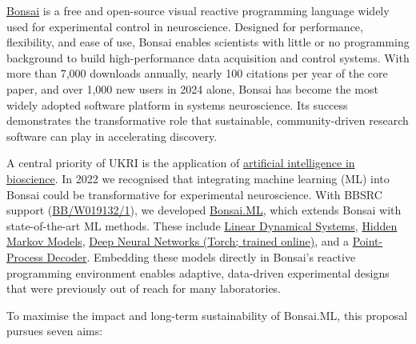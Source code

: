 \href{https://bonsai-rx.org/}{Bonsai} is a free and open-source visual reactive
programming language widely used for experimental control in neuroscience.
Designed for performance, flexibility, and ease of use, Bonsai enables
scientists with little or no programming background to build high-performance
data acquisition and control systems. With more than 7,000 downloads annually,
nearly 100 citations per year of the core paper, and over 1,000 new users in
2024 alone, Bonsai has become the most widely adopted software platform in
systems neuroscience. Its success demonstrates the transformative role that
sustainable, community-driven research software can play in accelerating
discovery.  

A central priority of UKRI is the application of
\href{https://www.ukri.org/what-we-do/browse-our-areas-of-investment-and-support/artificial-intelligence-in-bioscience/}{artificial
intelligence in bioscience}. In 2022 we recognised that integrating machine
learning (ML) into Bonsai could be transformative for experimental
neuroscience. With BBSRC support
(\href{https://gow.bbsrc.ukri.org/grants/AwardDetails.aspx?FundingReference=BB%2FW019132%2F1}{BB/W019132/1}),
we developed \href{https://bonsai-rx.org/machinelearning/}{Bonsai.ML}, which
extends Bonsai with state-of-the-art ML methods. These include
\href{https://bonsai-rx.org/machinelearning/examples/examples/LinearDynamicalSystems/README.html}{Linear
Dynamical Systems},
\href{https://bonsai-rx.org/machinelearning/examples/examples/HiddenMarkovModels/README.html}{Hidden
Markov Models},
\href{https://bonsai-rx.org/machinelearning/examples/examples/Torch/NeuralNetsTrainedOnline/README.html}{Deep
Neural Networks (Torch; trained online)}, and a
\href{https://bonsai-rx.org/machinelearning/examples/examples/PointProcessDecoder/DecodePositionFromHippocampusSortedUnits/README.html}{Point-Process
Decoder}. Embedding these models directly in Bonsai’s reactive programming
environment enables adaptive, data-driven experimental designs that were
previously out of reach for many laboratories.  

To maximise the impact and long-term sustainability of Bonsai.ML, this proposal
pursues seven aims:  


